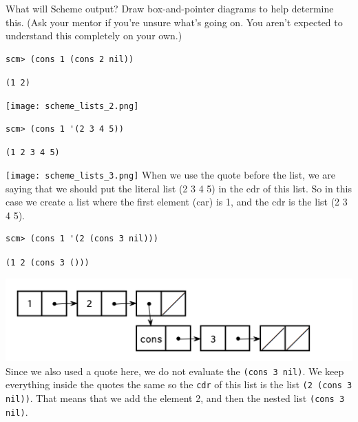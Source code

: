
\question What will Scheme output? Draw box-and-pointer diagrams to help determine this. (Ask your mentor if you're unsure what's going on. You aren't expected to understand this completely on your own.)
\begin{lstlisting}
scm> (cons 1 (cons 2 nil))
\end{lstlisting}
\begin{solution}[0.25in]
\texttt{(1 2)}
\begin{center}
\texttt{[image: scheme\_lists\_2.png]}
\end{center}
\end{solution}

\begin{lstlisting}
scm> (cons 1 '(2 3 4 5))
\end{lstlisting}
\begin{solution}[0.25in]
\texttt{(1 2 3 4 5)}
\begin{center}
\texttt{[image: scheme\_lists\_3.png]}
When we use the quote before the list, we are saying that we should put the literal list (2 3 4 5) in the cdr of this list. So in this case we create a list where the first element (car) is 1, and the cdr is the list (2 3 4 5).
\end{center}
\end{solution}

\begin{lstlisting}
scm> (cons 1 '(2 (cons 3 nil)))
\end{lstlisting}
\begin{solution}[0.25in]
\texttt{(1 2 (cons 3 ()))}
\begin{center}
\includegraphics[scale=0.7]{scheme_lists_5.png}
Since we also used a quote here, we do not evaluate the \texttt{(cons 3 nil)}. We keep everything inside the quotes the same so the \texttt{cdr} of this list is the list \texttt{(2 (cons 3 nil))}. That means that we add the element 2, and then the nested list \texttt{(cons 3 nil)}.
\end{center}
\end{solution}


